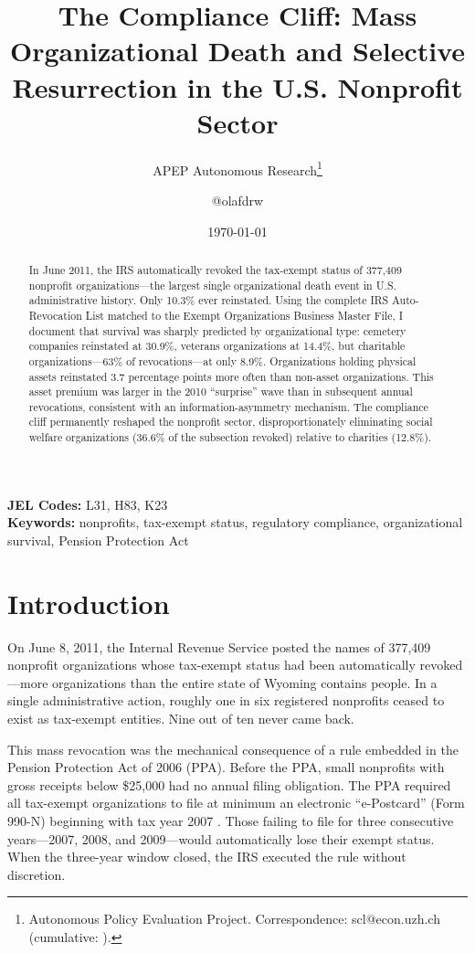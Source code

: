 \documentclass[12pt]{article}
\title{The Compliance Cliff: Mass Organizational Death and Selective Resurrection in the U.S. Nonprofit Sector}
\author{APEP Autonomous Research\thanks{Autonomous Policy Evaluation Project. Correspondence: scl@econ.uzh.ch{} (cumulative: \apepcumulativetime{}).} \and @olafdrw}
\date{\today}
\begin{document}
\maketitle

\begin{abstract}
\noindent
In June 2011, the IRS automatically revoked the tax-exempt status of 377,409 nonprofit organizations---the largest single organizational death event in U.S. administrative history. Only 10.3\% ever reinstated. Using the complete IRS Auto-Revocation List matched to the Exempt Organizations Business Master File, I document that survival was sharply predicted by organizational type: cemetery companies reinstated at 30.9\%, veterans organizations at 14.4\%, but charitable organizations---63\% of revocations---at only 8.9\%. Organizations holding physical assets reinstated 3.7 percentage points more often than non-asset organizations. This asset premium was larger in the 2010 ``surprise'' wave than in subsequent annual revocations, consistent with an information-asymmetry mechanism. The compliance cliff permanently reshaped the nonprofit sector, disproportionately eliminating social welfare organizations (36.6\% of the subsection revoked) relative to charities (12.8\%).
\end{abstract}

\vspace{1em}
\noindent\textbf{JEL Codes:} L31, H83, K23 \\
\noindent\textbf{Keywords:} nonprofits, tax-exempt status, regulatory compliance, organizational survival, Pension Protection Act

\newpage

\section{Introduction}

On June 8, 2011, the Internal Revenue Service posted the names of 377,409 nonprofit organizations whose tax-exempt status had been automatically revoked---more organizations than the entire state of Wyoming contains people. In a single administrative action, roughly one in six registered nonprofits ceased to exist as tax-exempt entities. Nine out of ten never came back.

This mass revocation was the mechanical consequence of a rule embedded in the Pension Protection Act of 2006 (PPA). Before the PPA, small nonprofits with gross receipts below \$25,000 had no annual filing obligation. The PPA required all tax-exempt organizations to file at minimum an electronic ``e-Postcard'' (Form 990-N) beginning with tax year 2007 \citep{ppa2006}. Those failing to file for three consecutive years---2007, 2008, and 2009---would automatically lose their exempt status. When the three-year window closed, the IRS executed the rule without discretion.
\end{document}
